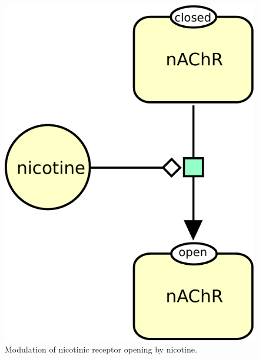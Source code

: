 \begin{figure}[H]
  \centering
  \includegraphics[scale = 0.5]{images/modulation-nAChR}
  \caption{Modulation of nicotinic receptor opening by nicotine.}
  \label{fig:modul-nico}
\end{figure}